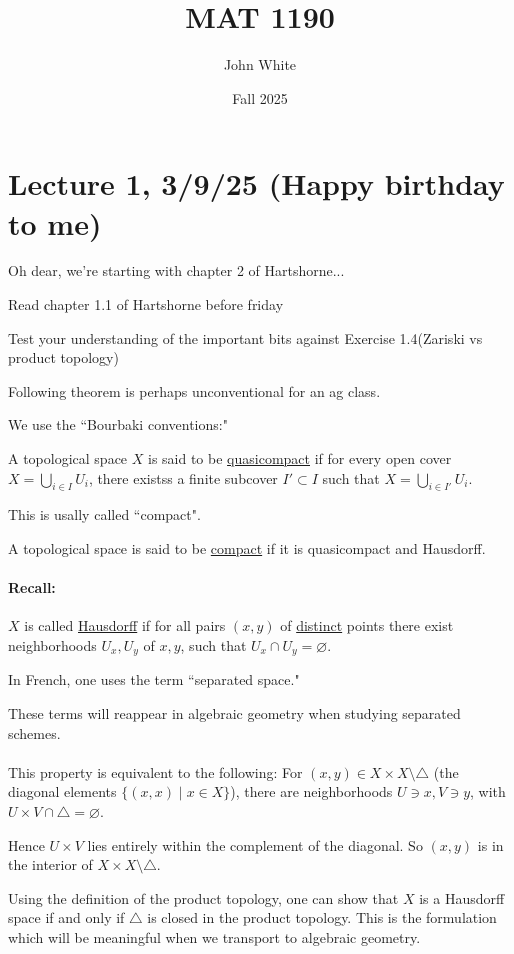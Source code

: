 \documentclass[x11names,reqno,14pt]{extarticle}
\title{MAT 1190}
\author{John White}
\date{Fall 2025}
\begin{document}
\section*{Lecture 1, 3/9/25 (Happy birthday to me)}

Oh dear, we're starting with chapter 2 of Hartshorne...

Read chapter 1.1 of Hartshorne before friday

Test your understanding of the important bits against Exercise 1.4(Zariski vs product topology)

Following theorem is perhaps unconventional for an ag class.

We use the 	``Bourbaki conventions:"


A topological space $X$ is said to be \underline{quasicompact} if for every open cover $X = \bigcup_{i\in I}U_i$, there existss a finite subcover $I' \subset I$ such that $X = \bigcup_{i\in I'}U_i$. 

This is usally called ``compact".


A topological space is said to be \underline{compact} if it is quasicompact and Hausdorff.

\paragraph{Recall:} $X$ is called \underline{Hausdorff} if for all pairs $(x, y)$ of \underline{distinct} points there exist neighborhoods $U_x, U_y$ of $x, y$, such that $U_x \cap U_y = \varnothing$. 

In French, one uses the term ``separated space."

These terms will reappear in algebraic geometry when studying separated schemes.

\paragraph{}

This property is equivalent to the following: For $(x, y) \in X\times X \setminus \bigtriangleup$ (the diagonal elements $\{(x,x) \mid x \in X\}$), there are neighborhoods $U \ni x, V \ni y$, with $U\times V \cap \bigtriangleup = \varnothing$. 

Hence $U\times V$ lies entirely within the complement of the diagonal. So $(x, y)$ is in the interior of $X\times X \setminus \bigtriangleup$. 

Using the definition of the product topology, one can show that $X$ is a Hausdorff space if and only if $\bigtriangleup$ is closed in the product topology. This is the formulation which will be meaningful when we transport to algebraic geometry. 
\end{document}
